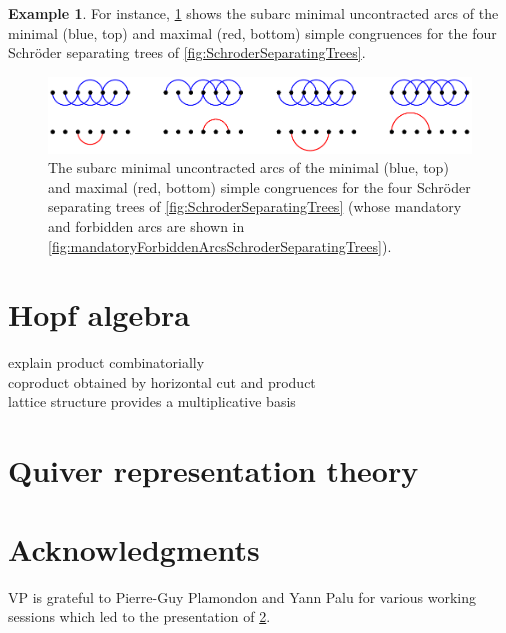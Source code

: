 \documentclass{amsart}
\theoremstyle{definition}
\newtheorem{example}[theorem]{Example}
\begin{document}
\begin{example}
For instance, \cref{fig:minMaxCongruencesSchroderSeparatingTrees} shows the subarc minimal uncontracted arcs of the minimal (blue, top) and maximal (red, bottom) simple congruences for the four Schröder separating trees of \cref{fig:SchroderSeparatingTrees}.
\begin{figure}
	\capstart
	\centerline{\includegraphics[scale=.85]{minMaxCongruencesSchroderSeparatingTrees}}
	\caption{The subarc minimal uncontracted arcs of the minimal (blue, top) and maximal (red, bottom) simple congruences for the four Schröder separating trees of \cref{fig:SchroderSeparatingTrees} (whose mandatory and forbidden arcs are shown in \cref{fig:mandatoryForbiddenArcsSchroderSeparatingTrees}).}
	\label{fig:minMaxCongruencesSchroderSeparatingTrees}
\end{figure}
\end{example}


\section{Hopf algebra}
\label{sec:HopfAlgebra}

explain product combinatorially \\
coproduct obtained by horizontal cut and product \\
lattice structure provides a multiplicative basis


\section{Quiver representation theory}
\label{subsec:representationTheory}


\section*{Acknowledgments}

VP is grateful to Pierre-Guy Plamondon and Yann Palu for various working sessions which led to the presentation of \cref{subsec:representationTheory}.




\label{sec:biblio}
\end{document}
